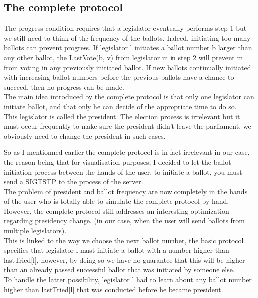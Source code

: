 \documentclass{article}
\begin{document}
\subsection{The complete protocol}
The progress condition requires that a legislator eventually performs step 1 but we still need to think of the frequency of the ballots. Indeed, initiating too many ballots can prevent progress. If legislator l initiates a ballot number b larger than any other ballot, the LastVote(b, v) from legislator m in step 2 will prevent m from voting in any previously initiated ballot. If new ballots continually initiated with increasing ballot numbers before the previous ballots have a chance to succeed, then no progress can be made.\\
The main idea introduced by the complete protocol is that only one legislator can initiate ballot, and that only he can decide of the appropriate time to do so.\\
This legislator is called the president. The election process is irrelevant but it must occur frequently to make sure the president didn't leave the parliament, we obviously need to change the president in such cases.

So as I mentionned earlier the complete protocol is in fact irrelevant in our case, the reason being that for visualisation purposes, I decided to let the ballot initiation process between the hands of the user, to initiate a ballot, you must send a SIGTSTP to the process of the server.\\
The problem of president and ballot frequency are now completely in the hands of the user who is totally able to simulate the complete protocol by hand.\\
However, the complete protocol still addresses an interesting optimization regarding presidency change. (in our case, when the user will send ballots from multiple legislators).\\
This is linked to the way we choose the next ballot number, the basic protocol specifies that legislator l must initiate a ballot with a number higher than lastTried[l], however, by doing so we have no guarantee that this will be higher than an already passed successful ballot that was initiated by someone else.\\
To handle the latter possibility, legislator l had to learn about any ballot number higher than lastTried[l] that was conducted before he became president.\\
\end{document}
